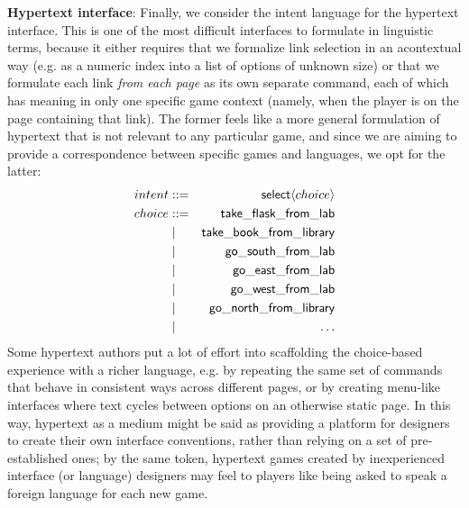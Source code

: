 


  \textbf{Hypertext interface}:
  Finally, we consider the intent language for the hypertext interface.
  This is one of the most difficult interfaces to formulate in linguistic
  terms, because it either requires that we formalize link selection in an
  acontextual way (e.g. as a numeric index into a list of options of
  unknown size) or that we formulate each link {\em from each page} as its
  own separate command, each of which has meaning in only one specific game
  context (namely, when the player is on the page containing that link).
  The former feels like a more general formulation of hypertext that is not
  relevant to any particular game, and since we are aiming to provide a
  correspondence between specific games and languages, we opt for the
  latter:
  \begin{eqnarray*}
    intent &::=& \mathsf{select}\langle choice \rangle\\
    choice &::=& \mathsf{take\_flask\_from\_lab}\\
           &\mid& \mathsf{take\_book\_from\_library}\\
           &\mid& \mathsf{go\_south\_from\_lab} \\
           &\mid& \mathsf{go\_east\_from\_lab} \\
           &\mid& \mathsf{go\_west\_from\_lab} \\
           &\mid& \mathsf{go\_north\_from\_library} \\
           &\mid& \hdots
  \end{eqnarray*}
  Some hypertext authors put a lot of effort into scaffolding the
  choice-based experience with a richer language, e.g. by repeating the
  same set of commands that behave in consistent ways across different
  pages, or by creating menu-like interfaces where text cycles between
  options on an otherwise static page. In this way, hypertext as a medium
  might be said as providing a platform for designers to create their own
  interface conventions, rather than relying on a set of pre-established
  ones; by the same token, hypertext games created by inexperienced
  interface (or language) designers may feel to players like being asked to
  speak a foreign language for each new game.

